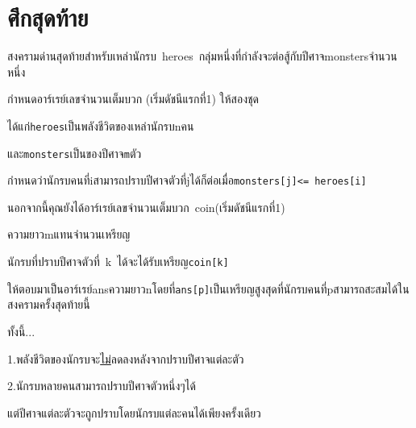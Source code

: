 \documentclass{article}
\begin{document}
\section*{ศึกสุดท้าย}

สงครามด่านสุดท้ายสำหรับเหล่านักรบ~heroes~กลุ่มหนึ่งที่กำลังจะต่อสู้กับปีศาจmonstersจำนวนหนึ่ง

กำหนดอาร์เรย์เลขจำนวนเต็มบวก (เริ่มดัชนีแรกที่1) ให้สองชุด

ได้แก่\texttt{heroes}เป็นพลังชีวิตของเหล่านักรบnคน

และ\texttt{monsters}เป็นของปีศาจ\texttt{m}ตัว

กำหนดว่านักรบคนที่iสามารถปราบปีศาจตัวที่jได้ก็ต่อเมื่อ\texttt{monsters{[}j{]}\textless{}=\ heroes{[}i{]}}



นอกจากนี้คุณยังได้อาร์เรย์เลขจำนวนเต็มบวก~coin(เริ่มดัชนีแรกที่1)

ความยาวmแทนจำนวนเหรียญ

นักรบที่ปราบปีศาจตัวที่~k~ได้จะได้รับเหรียญ\texttt{coin{[}k{]}}



ให้ตอบมาเป็นอาร์เรย์ansความยาวnโดยที่\texttt{ans{[}p{]}}เป็นเหรียญสูงสุดที่นักรบคนที่pสามารถสะสมได้ในสงครามครั้งสุดท้ายนี้

ทั้งนี้...



1.พลังชีวิตของนักรบจะ\ul{ไม่}ลดลงหลังจากปราบปีศาจแต่ละตัว



2.นักรบหลายคนสามารถปราบปีศาจตัวหนึ่งๆได้

แต่ปีศาจแต่ละตัวจะถูกปราบโดยนักรบแต่ละคนได้เพียงครั้งเดียว



\hfill\break
\end{document}
